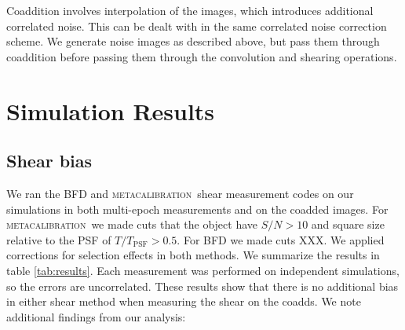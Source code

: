 \documentclass[fleqn,useAMS,usenatbib]{mnras}
\newcommand{\snr}{$S/N$}
\newcommand{\mcal}{\textsc{metacalibration}}
\begin{document}
Coaddition involves interpolation of the images, which introduces additional
correlated noise.  This can be dealt with in the same correlated noise
correction scheme.  We generate noise images as described above, but pass them
through coaddition before passing them through the convolution and shearing
operations.


\section{Simulation Results}
\label{Section:Results}

\subsection{Shear bias} We ran the BFD and \mcal\ shear measurement codes on
our simulations in both multi-epoch measurements and on the coadded images. For
\mcal\ we made cuts that the object have \snr$ > 10$ and square size relative
to the PSF of $T/T_{\mathrm{PSF}} > 0.5$.  For BFD we made cuts XXX.  We
applied corrections for selection effects in both methods.  We summarize the
results in table \ref{tab:results}.  Each measurement was performed on
independent simulations, so the errors are uncorrelated.  These results show
that there is no additional bias in either shear method when measuring the
shear on the coadds.  We note additional findings from our
analysis: 
\end{document}
